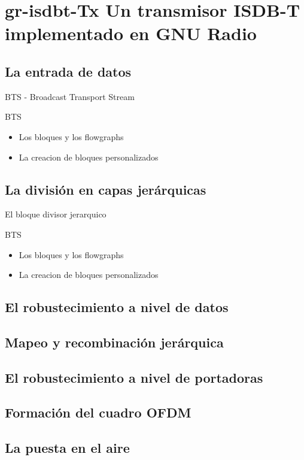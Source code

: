 \section{gr-isdbt-Tx Un transmisor ISDB-T implementado en GNU Radio}

\subsection{La entrada de datos}
	\begin{frame}{BTS - Broadcast Transport Stream}
	\begin{block}{BTS}
		\begin{itemize}
			\item {	Los bloques y los flowgraphs }
			\item { La creacion de bloques personalizados }
		\end{itemize}
	\end{block}
	\end{frame}
\subsection{La división en capas jerárquicas}
	\begin{frame}{El bloque divisor jerarquico}
	\begin{block}{BTS}
	\begin{itemize}
		\item {	Los bloques y los flowgraphs }
		\item { La creacion de bloques personalizados }
	\end{itemize}
	\end{block}
\end{frame}
\subsection{El robustecimiento a nivel de datos}
\subsection{Mapeo y recombinación jerárquica}
\subsection{El robustecimiento a nivel de portadoras}
\subsection{Formación del cuadro OFDM}
\subsection{La puesta en el aire}